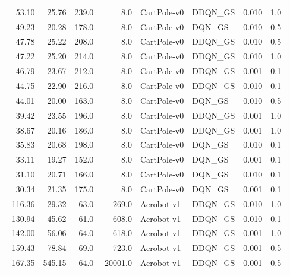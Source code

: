 \begin{tabular}{rrrrllrr}
   53.10 &    25.76 &  239.0 &      8.0 &     CartPole-v0 &  DDQN\_GS &          0.010 &           1.0 \\
   49.23 &    20.28 &  178.0 &      8.0 &     CartPole-v0 &   DQN\_GS &          0.010 &           0.5 \\
   47.78 &    25.22 &  208.0 &      8.0 &     CartPole-v0 &  DDQN\_GS &          0.010 &           0.5 \\
   47.22 &    25.20 &  214.0 &      8.0 &     CartPole-v0 &  DDQN\_GS &          0.010 &           1.0 \\
   46.79 &    23.67 &  212.0 &      8.0 &     CartPole-v0 &  DDQN\_GS &          0.001 &           0.1 \\
   44.75 &    22.90 &  216.0 &      8.0 &     CartPole-v0 &  DDQN\_GS &          0.010 &           0.1 \\
   44.01 &    20.00 &  163.0 &      8.0 &     CartPole-v0 &   DQN\_GS &          0.010 &           0.5 \\
   39.42 &    23.55 &  196.0 &      8.0 &     CartPole-v0 &  DDQN\_GS &          0.001 &           1.0 \\
   38.67 &    20.16 &  186.0 &      8.0 &     CartPole-v0 &  DDQN\_GS &          0.001 &           1.0 \\
   35.83 &    20.68 &  198.0 &      8.0 &     CartPole-v0 &   DQN\_GS &          0.010 &           0.1 \\
   33.11 &    19.27 &  152.0 &      8.0 &     CartPole-v0 &   DQN\_GS &          0.001 &           0.1 \\
   31.10 &    20.71 &  166.0 &      8.0 &     CartPole-v0 &   DQN\_GS &          0.010 &           0.1 \\
   30.34 &    21.35 &  175.0 &      8.0 &     CartPole-v0 &   DQN\_GS &          0.001 &           0.1 \\
 -116.36 &    29.32 &  -63.0 &   -269.0 &      Acrobot-v1 &  DDQN\_GS &          0.010 &           1.0 \\
 -130.94 &    45.62 &  -61.0 &   -608.0 &      Acrobot-v1 &  DDQN\_GS &          0.010 &           0.1 \\
 -142.00 &    56.06 &  -64.0 &   -618.0 &      Acrobot-v1 &  DDQN\_GS &          0.001 &           1.0 \\
 -159.43 &    78.84 &  -69.0 &   -723.0 &      Acrobot-v1 &  DDQN\_GS &          0.001 &           0.5 \\
 -167.35 &   545.15 &  -64.0 & -20001.0 &      Acrobot-v1 &  DDQN\_GS &          0.001 &           0.5 \\

\end{tabular}
